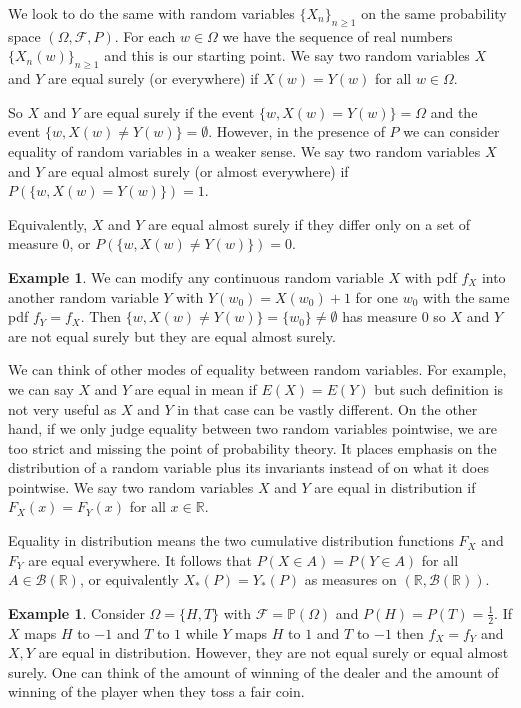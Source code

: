 \documentclass[12pt]{amsart}
\theoremstyle{definition}
\newtheorem{example}[theorem]{Example}
\begin{document}
We look to do the same with random variables $\{X_n\}_{n \geq 1}$ on the same probability space $(\Omega, \mathcal{F}, P)$. For each $w \in \Omega$ we have the sequence of real numbers $\{X_n(w)\}_{n \geq 1}$ and this is our starting point.
\dfn We say two random variables $X$ and $Y$ are equal surely (or everywhere) if $X(w) = Y(w)$ for all $w \in \Omega$.

So $X$ and $Y$ are equal surely if the event $\{w, X(w) = Y(w)\} = \Omega$ and the event $\{w, X(w) \neq Y(w)\} = \emptyset$. However, in the presence of $P$ we can consider equality of random variables in a weaker sense.
\dfn We say two random variables $X$ and $Y$ are equal almost surely (or almost everywhere) if $P(\{w, X(w) = Y(w)\}) = 1$.

Equivalently, $X$ and $Y$ are equal almost surely if they differ only on a set of measure 0, or $P(\{w, X(w) \neq Y(w)\}) = 0$. 

\begin{example} We can modify any continuous random variable $X$ with pdf $f_X$ into another random variable $Y$ with $Y(w_0) = X(w_0) + 1$ for one $w_0$ with the same pdf $f_Y = f_X$. Then $\{w, X(w) \neq Y(w)\} = \{w_0\} \neq \emptyset$ has measure 0 so $X$ and $Y$ are not equal surely but they are equal almost surely.
\end{example}

We can think of other modes of equality between random variables. For example, we can say $X$ and $Y$ are equal in mean if $E(X) = E(Y)$ but such definition is not very useful as $X$ and $Y$ in that case can be vastly different. On the other hand, if we only judge equality between two random variables pointwise, we are too strict and missing the point of probability theory. It places emphasis on the distribution of a random variable plus its invariants instead of on what it does pointwise.
\dfn We say two random variables $X$ and $Y$ are equal in distribution if $F_X(x) = F_Y(x)$ for all $x \in \mathbb{R}$.

Equality in distribution means the two cumulative distribution functions $F_X$ and $F_Y$ are equal everywhere. It follows that $P(X \in A) = P(Y \in A)$ for all $A \in \mathcal{B}(\mathbb{R})$, or equivalently $X_*(P) = Y_*(P)$ as measures on $(\mathbb{R}, \mathcal{B}(\mathbb{R}))$.

\begin{example} Consider $\Omega = \{H, T\}$ with $\mathcal{F} = \mathbb{P}(\Omega)$ and $P(H) = P(T) = \frac{1}{2}$. If $X$ maps $H$ to $-1$ and $T$ to $1$ while $Y$ maps $H$ to $1$ and $T$ to $-1$ then $f_X = f_Y$ and $X, Y$ are equal in distribution. However, they are not equal surely or equal almost surely. One can think of the amount of winning of the dealer and the amount of winning of the player when they toss a fair coin.
\end{example}
\end{document}

